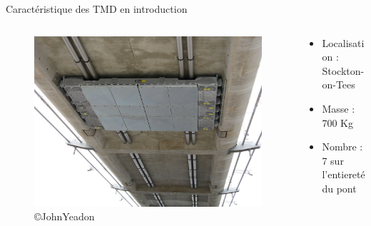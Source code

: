 \documentclass{beamer}
\begin{document}
	\begin{frame}{Caractéristique des TMD en introduction}
		\begin{columns}
			\begin{column}{0.5\textwidth}
				\begin{figure}
					\includegraphics[width=\textwidth]{Image/TMD pont.jpg}
					\caption{\copyright JohnYeadon}
				\end{figure}
			\end{column}
			\begin{column}{0.5\textwidth}
				\begin{itemize}
					\item Localisation : Stockton-on-Tees
					\item Masse : 700 Kg
					\item Nombre : 7 sur l'entiereté du pont
				\end{itemize}
			\end{column}
			
		\end{columns}
	\end{frame}
\end{document}
